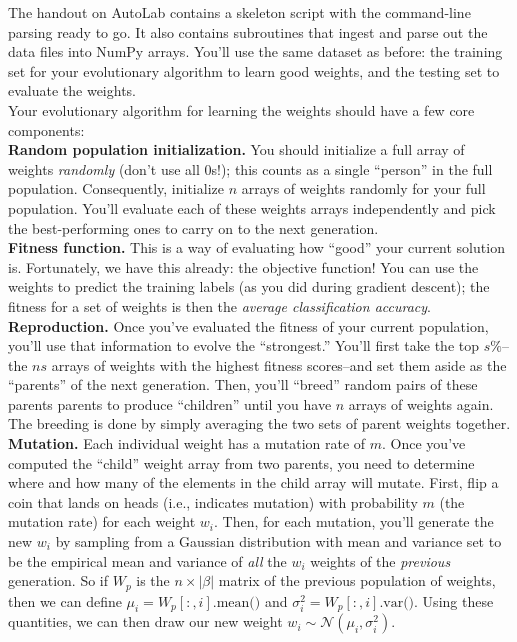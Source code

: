 \documentclass[paper=a4, fontsize=11pt]{scrartcl} %
\numberwithin{figure}{section} %
\numberwithin{table}{section} %
\begin{document}
The handout on AutoLab contains a skeleton script with the command-line parsing ready to go. It also contains subroutines that ingest and parse out the data files into NumPy arrays. You'll use the same dataset as before: the training set for your evolutionary algorithm to learn good weights, and the testing set to evaluate the weights. \\

Your evolutionary algorithm for learning the weights should have a few core components: \\

\textbf{Random population initialization.} You should initialize a full array of weights \emph{randomly} (don't use all 0s!); this counts as a single ``person'' in the full population. Consequently, initialize $n$ arrays of weights randomly for your full population. You'll evaluate each of these weights arrays independently and pick the best-performing ones to carry on to the next generation. \\

\textbf{Fitness function.} This is a way of evaluating how ``good'' your current solution is. Fortunately, we have this already: the objective function! You can use the weights to predict the training labels (as you did during gradient descent); the fitness for a set of weights is then the \emph{average classification accuracy}. \\

\textbf{Reproduction.} Once you've evaluated the fitness of your current population, you'll use that information to evolve the ``strongest.'' You'll first take the top $s\%$--the $ns$ arrays of weights with the highest fitness scores--and set them aside as the ``parents'' of the next generation. Then, you'll ``breed'' random pairs of these parents parents to produce ``children'' until you have $n$ arrays of weights again. The breeding is done by simply averaging the two sets of parent weights together. \\

\textbf{Mutation.} Each individual weight has a mutation rate of $m$. Once you've computed the ``child'' weight array from two parents, you need to determine where and how many of the elements in the child array will mutate. First, flip a coin that lands on heads (i.e., indicates mutation) with probability $m$ (the mutation rate) for each weight $w_i$. Then, for each mutation, you'll generate the new $w_i$ by sampling from a Gaussian distribution with mean and variance set to be the empirical mean and variance of \emph{all} the $w_i$ weights of the \emph{previous} generation. So if $W_{p}$ is the $n \times |\beta|$ matrix of the previous population of weights, then we can define $\mu_i = W_p\left[:, i\right]\textrm{.mean()}$ and $\sigma_i^2 = W_p\left[:, i\right]\textrm{.var()}$. Using these quantities, we can then draw our new weight $w_i \sim \mathcal{N}(\mu_i, \sigma_i^2)$. \\
\end{document}
